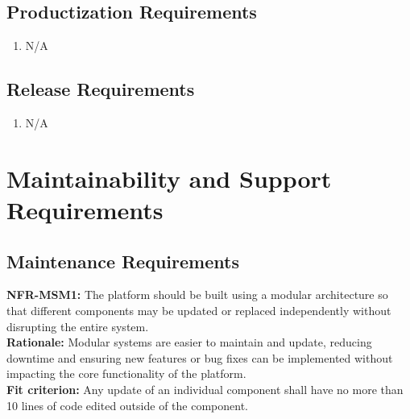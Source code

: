 \documentclass[12pt]{article}
\begin{document}
\subsection{Productization Requirements}
\begin{enumerate}[{OE-P}1. ]
  \item N/A
\end{enumerate}
\subsection{Release Requirements}
\begin{enumerate}[{OE-R}1. ]
  \item N/A
\end{enumerate}

\section{Maintainability and Support Requirements}
\subsection{Maintenance Requirements}
\textbf{NFR-MSM1: }The platform should be built using a modular architecture so that different components may be updated or replaced independently without disrupting the entire system.\\
\textbf{Rationale: }Modular systems are easier to maintain and update, reducing downtime and ensuring new features or bug fixes can be implemented without impacting the core functionality of the platform.\\
\textbf{Fit criterion: }Any update of an individual component shall have no more than 10 lines of code edited outside of the component.\\\\
\end{document}
